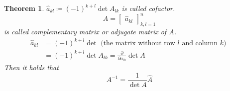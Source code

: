 \documentclass[a4paper]{article}
\newcounter{lecref}[section]
\numberwithin{lecref}{section}
\newtheorem{theorem}[lecref]{Theorem}
\begin{document}
\begin{theorem} %
  $\hat{a}_{kl} \coloneqq (-1)^{k+l} \det{A_{lk}}$ is called \emph{cofactor}.
  \[ \hat{A} = \begin{bmatrix} \hat{a}_{kl} \end{bmatrix}_{k,l=1}^n \]
  is called \emph{complementary matrix} or \emph{adjugate matrix} of $A$.
  \begin{align*}
    \hat{a}_{kl}
    &= (-1)^{k+l} \det \text{ (the matrix without row $l$ and column $k$) } \\
    &= (-1)^{k+l} \det{A_{lk}} = \frac{\partial}{\partial a_{lk}} \det{A}
  \end{align*}
  Then it holds that
  \[ A^{-1} = \frac{1}{\det{A}} \hat{A} \]
\end{theorem}
\end{document}
